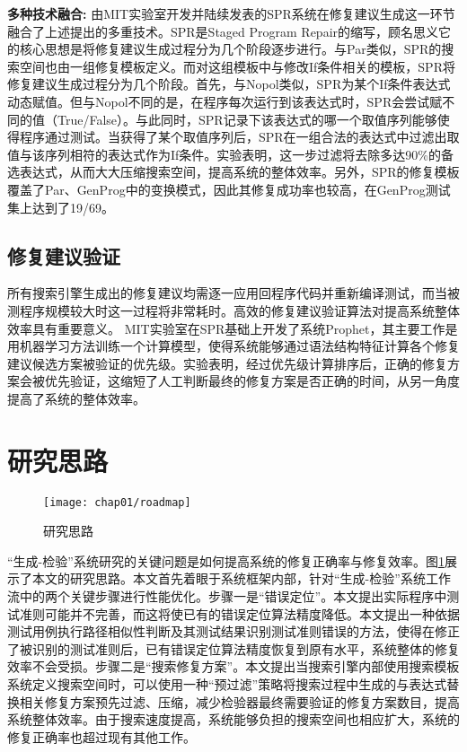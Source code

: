 
\textbf{多种技术融合:}
由MIT实验室开发并陆续发表的SPR系统在修复建议生成这一环节融合了上述提出的多重技术。SPR是Staged Program Repair的缩写，顾名思义它的核心思想是将修复建议生成过程分为几个阶段逐步进行。与Par类似，SPR的搜索空间也由一组修复模板定义。而对这组模板中与修改If条件相关的模板，SPR将修复建议生成过程分为几个阶段。首先，与Nopol类似，SPR为某个If条件表达式动态赋值。但与Nopol不同的是，在程序每次运行到该表达式时，SPR会尝试赋不同的值（True/False）。与此同时，SPR记录下该表达式的哪一个取值序列能够使得程序通过测试。当获得了某个取值序列后，SPR在一组合法的表达式中过滤出取值与该序列相符的表达式作为If条件。实验表明，这一步过滤将去除多达90\%的备选表达式，从而大大压缩搜索空间，提高系统的整体效率。另外，SPR的修复模板覆盖了Par、GenProg中的变换模式，因此其修复成功率也较高，在GenProg测试集上达到了19/69。

\subsection{修复建议验证}

所有搜索引擎生成出的修复建议均需逐一应用回程序代码并重新编译测试，而当被测程序规模较大时这一过程将非常耗时。高效的修复建议验证算法对提高系统整体效率具有重要意义。
MIT实验室在SPR基础上开发了系统Prophet，其主要工作是用机器学习方法训练一个计算模型，使得系统能够通过语法结构特征计算各个修复建议候选方案被验证的优先级。实验表明，经过优先级计算排序后，正确的修复方案会被优先验证，这缩短了人工判断最终的修复方案是否正确的时间，从另一角度提高了系统的整体效率。



\section{研究思路}%
\begin{figure}
	\centering
	\texttt{[image: chap01/roadmap]}
	\caption{研究思路}
	\label{fig:roadmap}
\end{figure}

“生成-检验”系统研究的关键问题是如何提高系统的修复正确率与修复效率。图\ref{fig:roadmap}展示了本文的研究思路。本文首先着眼于系统框架内部，针对“生成-检验”系统工作流中的两个关键步骤进行性能优化。步骤一是“错误定位”。本文提出实际程序中测试准则可能并不完善，而这将使已有的错误定位算法精度降低。本文提出一种依据测试用例执行路径相似性判断及其测试结果识别测试准则错误的方法，使得在修正了被识别的测试准则后，已有错误定位算法精度恢复到原有水平，系统整体的修复效率不会受损。步骤二是“搜索修复方案”。本文提出当搜索引擎内部使用搜索模板系统定义搜索空间时，可以使用一种“预过滤”策略将搜索过程中生成的与表达式替换相关修复方案预先过滤、压缩，减少检验器最终需要验证的修复方案数目，提高系统整体效率。由于搜索速度提高，系统能够负担的搜索空间也相应扩大，系统的修复正确率也超过现有其他工作。

